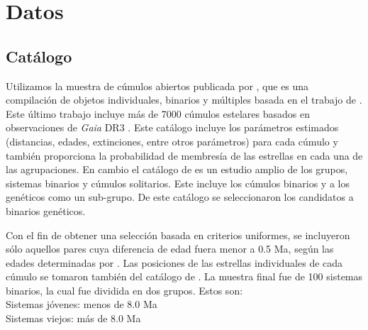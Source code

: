 \documentclass[baaa]{baaa}
\begin{document}
\section{Datos}

\subsection{Catálogo}

\noindent Utilizamos la muestra de cúmulos abiertos publicada por \cite{Palma2025}, que es una compilación de objetos individuales, binarios y múltiples basada en el trabajo de \cite{Hunt2024}. Este último trabajo incluye más de 7000 cúmulos estelares basados en observaciones de {\sl Gaia}  DR3 \citep{Gaia2021}. Este catálogo incluye los parámetros estimados (distancias, edades, extinciones, entre otros parámetros) para cada cúmulo y también proporciona la probabilidad de membresía de las estrellas en cada una de las agrupaciones.   
En cambio el catálogo de \cite{Palma2025} es un estudio amplio de los grupos, sistemas binarios y cúmulos solitarios.  Este  incluye los cúmulos binarios y a los genéticos como un sub-grupo. De este catálogo se seleccionaron los  candidatos a binarios genéticos. 


\noindent  %
Con el fin de obtener una selección basada en criterios uniformes, se incluyeron sólo aquellos pares cuya diferencia de edad fuera menor a 0.5 Ma, según las edades determinadas por \cite{Hunt2024}.  Las posiciones de las estrellas individuales de cada cúmulo se tomaron también del catálogo de \cite{Hunt2024}. La muestra final fue de 100 sistemas binarios, la cual fue dividida en dos grupos.
Estos son:\\


\noindent Sistemas jóvenes: menos de 8.0 Ma\\
\noindent  Sistemas viejos: más de 8.0 Ma\\
\end{document}
